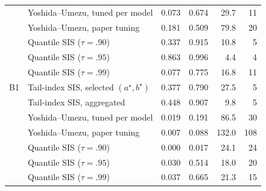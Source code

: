 \begin{table}[t]
\begin{tabular}{llrrrr}
 & Yoshida--Umezu, tuned per model & 0.073 & 0.674 & 29.7 & 11\\
 & Yoshida--Umezu, paper tuning & 0.181 & 0.509 & 79.8 & 20\\
 & Quantile SIS ($\tau=.90$) & 0.337 & 0.915 & 10.8 & 5\\
 & Quantile SIS ($\tau=.95$) & 0.863 & 0.996 & 4.4 & 4\\
 & Quantile SIS ($\tau=.99$) & 0.077 & 0.775 & 16.8 & 11\\
\addlinespace
B1 & Tail-index SIS, selected $(a^\star,b^\star)$ & 0.377 & 0.790 & 27.5 & 5\\
 & Tail-index SIS, aggregated & 0.448 & 0.907 & 9.8 & 5\\
 & Yoshida--Umezu, tuned per model & 0.019 & 0.191 & 86.5 & 30\\
 & Yoshida--Umezu, paper tuning & 0.007 & 0.088 & 132.0 & 108\\
 & Quantile SIS ($\tau=.90$) & 0.000 & 0.017 & 24.1 & 24\\
 & Quantile SIS ($\tau=.95$) & 0.030 & 0.514 & 18.0 & 20\\
 & Quantile SIS ($\tau=.99$) & 0.037 & 0.665 & 21.3 & 15\\
\bottomrule
\end{tabular}
\end{table}
